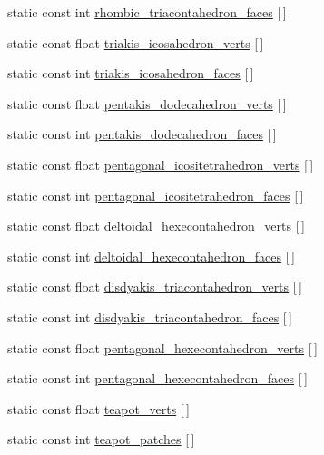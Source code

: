\begin{DoxyCompactItemize}
static const int \hyperlink{namespacetrimesh_a4ab1d73590d2ad252b5d23db85697348}{rhombic\+\_\+triacontahedron\+\_\+faces} \mbox{[}$\,$\mbox{]}
\item 
static const float \hyperlink{namespacetrimesh_acb298922bb8eec3d90a2d866cb4e58a3}{triakis\+\_\+icosahedron\+\_\+verts} \mbox{[}$\,$\mbox{]}
\item 
static const int \hyperlink{namespacetrimesh_a108650043dfd7227ad2df2c75963c957}{triakis\+\_\+icosahedron\+\_\+faces} \mbox{[}$\,$\mbox{]}
\item 
static const float \hyperlink{namespacetrimesh_a5b17455ab050c41c96d91f96b545b1a6}{pentakis\+\_\+dodecahedron\+\_\+verts} \mbox{[}$\,$\mbox{]}
\item 
static const int \hyperlink{namespacetrimesh_a51ee0566ad6bf7254f52158a396abd9d}{pentakis\+\_\+dodecahedron\+\_\+faces} \mbox{[}$\,$\mbox{]}
\item 
static const float \hyperlink{namespacetrimesh_ac9660531cc8778c4bf7261614be3c71d}{pentagonal\+\_\+icositetrahedron\+\_\+verts} \mbox{[}$\,$\mbox{]}
\item 
static const int \hyperlink{namespacetrimesh_aba13af32b8ac8d7921a78bc8a31e5dfb}{pentagonal\+\_\+icositetrahedron\+\_\+faces} \mbox{[}$\,$\mbox{]}
\item 
static const float \hyperlink{namespacetrimesh_a6cd785692b5e6475b72f0b6b4100fb39}{deltoidal\+\_\+hexecontahedron\+\_\+verts} \mbox{[}$\,$\mbox{]}
\item 
static const int \hyperlink{namespacetrimesh_ab63f30606fb8d52eacf0421cb3e3ba63}{deltoidal\+\_\+hexecontahedron\+\_\+faces} \mbox{[}$\,$\mbox{]}
\item 
static const float \hyperlink{namespacetrimesh_a7f451a634e9ac00cfe8d84526662d2fd}{disdyakis\+\_\+triacontahedron\+\_\+verts} \mbox{[}$\,$\mbox{]}
\item 
static const int \hyperlink{namespacetrimesh_a5f0bf3f2c7a228af1c3a8b59e25fec5b}{disdyakis\+\_\+triacontahedron\+\_\+faces} \mbox{[}$\,$\mbox{]}
\item 
static const float \hyperlink{namespacetrimesh_a59b1bc02739ea87e89efe0d63e5d5673}{pentagonal\+\_\+hexecontahedron\+\_\+verts} \mbox{[}$\,$\mbox{]}
\item 
static const int \hyperlink{namespacetrimesh_a1d9acbc17e29419b4659783fca9f05fb}{pentagonal\+\_\+hexecontahedron\+\_\+faces} \mbox{[}$\,$\mbox{]}
\item 
static const float \hyperlink{namespacetrimesh_a6d647a773d62f348393189916fbc7b63}{teapot\+\_\+verts} \mbox{[}$\,$\mbox{]}
\item 
static const int \hyperlink{namespacetrimesh_acd1cfb9298f0add547ec3b098909f378}{teapot\+\_\+patches} \mbox{[}$\,$\mbox{]}
\end{DoxyCompactItemize}


